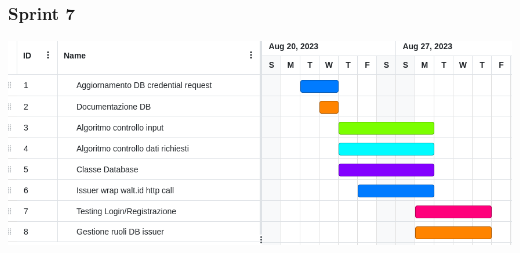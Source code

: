         \subsubsection{Sprint 7}
        \begin{center}
            \includegraphics[scale = 0.5]{./res/img/Sprint 7.png}
          \end{center}
